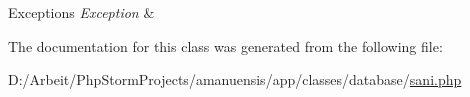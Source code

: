 \begin{DoxyExceptions}{Exceptions}
{\em Exception} & \\
\hline
\end{DoxyExceptions}


The documentation for this class was generated from the following file\+:\begin{DoxyCompactItemize}
\item 
D\+:/\+Arbeit/\+Php\+Storm\+Projects/amanuensis/app/classes/database/\hyperlink{a00089}{sani.\+php}\end{DoxyCompactItemize}
